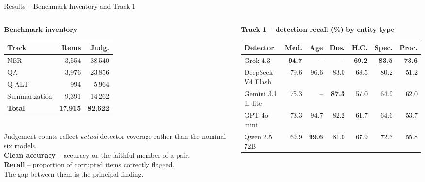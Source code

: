 \documentclass[aspectratio=169,11pt]{beamer}
\begin{document}
\begin{frame}[shrink=12]{Results \;--\; Benchmark Inventory and Track 1}
\vspace{-2mm}
{\footnotesize
\begin{columns}[T]
\begin{column}{0.36\textwidth}
\textbf{Benchmark inventory}\\[1mm]
\begin{tabular}{@{}lrr@{}}
\toprule
\textbf{Track} & \textbf{Items} & \textbf{Judg.}\\
\midrule
NER & 3,554 & 38,540\\
QA & 3,976 & 23,856\\
Q-ALT & 994 & 5,964\\
Summarization & 9,391 & 14,262\\
\midrule
\textbf{Total} & \textbf{17,915} & \textbf{82,622}\\
\bottomrule
\end{tabular}\\[3mm]
{\scriptsize Judgement counts reflect \emph{actual} detector coverage rather than the nominal six models.}\\[3mm]
{\scriptsize\color{soft}\textbf{Clean accuracy} -- accuracy on the faithful member of a pair.\\[1mm]
\textbf{Recall} -- proportion of corrupted items correctly flagged.\\[1mm] The gap between them is the principal finding.}
\end{column}
\begin{column}{0.62\textwidth}
\textbf{Track 1 -- detection recall (\%) by entity type}\\[1mm]
\begin{tabular}{@{}lrrrrrr@{}}
\toprule
\textbf{Detector} & \textbf{Med.} & \textbf{Age} & \textbf{Dos.} & \textbf{H.C.} & \textbf{Spec.} & \textbf{Proc.}\\
\midrule
Grok-4.3 & \textbf{94.7} & -- & -- & \textbf{69.2} & \textbf{83.5} & \textbf{73.6}\\
DeepSeek V4 Flash & 79.6 & 96.6 & 83.0 & 68.5 & 80.2 & 51.2\\
Gemini 3.1 fl.-lite & 75.3 & -- & \textbf{87.3} & 57.0 & 64.9 & 62.0\\
GPT-4o-mini & 73.3 & 94.7 & 82.2 & 61.7 & 64.6 & 53.7\\
Qwen 2.5 72B & 69.9 & \textbf{99.6} & 81.0 & 67.9 & 72.3 & 55.8\\

\end{tabular}
\end{column}
\end{columns}}
\end{frame}
\end{document}

